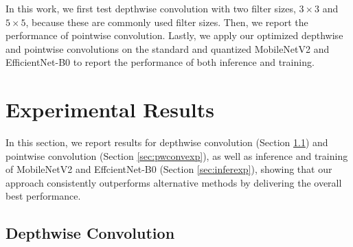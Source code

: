 In this work, we first test depthwise convolution with two filter sizes, $3 \times 3$ and $5 \times 5$, because these are commonly used
filter sizes. Then, we report the performance of pointwise convolution. Lastly, we apply our optimized depthwise and pointwise convolutions
on the standard and quantized MobileNetV2 and EfficientNet-B0 to report the performance of both inference and training.
%

\section{Experimental Results}
\label{exp} In this section, we report results for depthwise convolution (Section \ref{sec:depconvexp}) and pointwise convolution (Section
\ref{sec:pwconvexp}), as well as inference and training of MobileNetV2 and EffcientNet-B0 (Section \ref{sec:inferexp}), showing that our approach consistently
outperforms alternative methods by delivering the overall best performance.


\subsection{Depthwise Convolution}
\label{sec:depconvexp}

